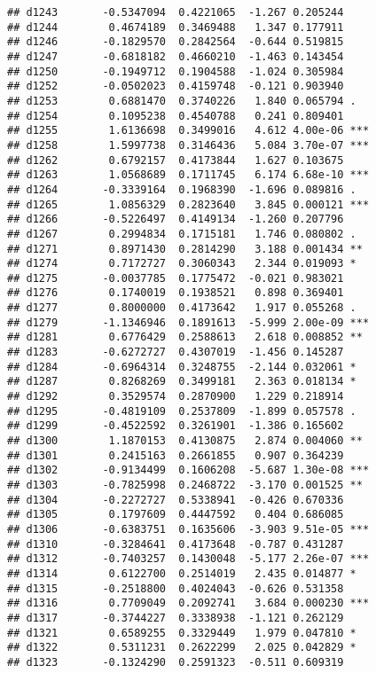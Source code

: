 \documentclass[
]{article}
\begin{document}
\begin{verbatim}
## d1243       -0.5347094  0.4221065  -1.267 0.205244    
## d1244        0.4674189  0.3469488   1.347 0.177911    
## d1246       -0.1829570  0.2842564  -0.644 0.519815    
## d1247       -0.6818182  0.4660210  -1.463 0.143454    
## d1250       -0.1949712  0.1904588  -1.024 0.305984    
## d1252       -0.0502023  0.4159748  -0.121 0.903940    
## d1253        0.6881470  0.3740226   1.840 0.065794 .  
## d1254        0.1095238  0.4540788   0.241 0.809401    
## d1255        1.6136698  0.3499016   4.612 4.00e-06 ***
## d1258        1.5997738  0.3146436   5.084 3.70e-07 ***
## d1262        0.6792157  0.4173844   1.627 0.103675    
## d1263        1.0568689  0.1711745   6.174 6.68e-10 ***
## d1264       -0.3339164  0.1968390  -1.696 0.089816 .  
## d1265        1.0856329  0.2823640   3.845 0.000121 ***
## d1266       -0.5226497  0.4149134  -1.260 0.207796    
## d1267        0.2994834  0.1715181   1.746 0.080802 .  
## d1271        0.8971430  0.2814290   3.188 0.001434 ** 
## d1274        0.7172727  0.3060343   2.344 0.019093 *  
## d1275       -0.0037785  0.1775472  -0.021 0.983021    
## d1276        0.1740019  0.1938521   0.898 0.369401    
## d1277        0.8000000  0.4173642   1.917 0.055268 .  
## d1279       -1.1346946  0.1891613  -5.999 2.00e-09 ***
## d1281        0.6776429  0.2588613   2.618 0.008852 ** 
## d1283       -0.6272727  0.4307019  -1.456 0.145287    
## d1284       -0.6964314  0.3248755  -2.144 0.032061 *  
## d1287        0.8268269  0.3499181   2.363 0.018134 *  
## d1292        0.3529574  0.2870900   1.229 0.218914    
## d1295       -0.4819109  0.2537809  -1.899 0.057578 .  
## d1299       -0.4522592  0.3261901  -1.386 0.165602    
## d1300        1.1870153  0.4130875   2.874 0.004060 ** 
## d1301        0.2415163  0.2661855   0.907 0.364239    
## d1302       -0.9134499  0.1606208  -5.687 1.30e-08 ***
## d1303       -0.7825998  0.2468722  -3.170 0.001525 ** 
## d1304       -0.2272727  0.5338941  -0.426 0.670336    
## d1305        0.1797609  0.4447592   0.404 0.686085    
## d1306       -0.6383751  0.1635606  -3.903 9.51e-05 ***
## d1310       -0.3284641  0.4173648  -0.787 0.431287    
## d1312       -0.7403257  0.1430048  -5.177 2.26e-07 ***
## d1314        0.6122700  0.2514019   2.435 0.014877 *  
## d1315       -0.2518800  0.4024043  -0.626 0.531358    
## d1316        0.7709049  0.2092741   3.684 0.000230 ***
## d1317       -0.3744227  0.3338938  -1.121 0.262129    
## d1321        0.6589255  0.3329449   1.979 0.047810 *  
## d1322        0.5311231  0.2622299   2.025 0.042829 *  
## d1323       -0.1324290  0.2591323  -0.511 0.609319    

\end{verbatim}
\end{document}
